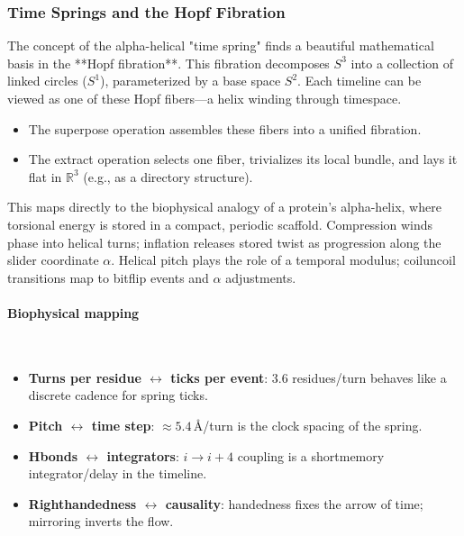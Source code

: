 \documentclass{article}
\begin{document}
\subsubsection{Time Springs and the Hopf Fibration}
The concept of the alpha-helical "time spring" finds a beautiful mathematical basis in the **Hopf fibration**. This fibration decomposes $S^3$ into a collection of linked circles ($S^1$), parameterized by a base space $S^2$. Each timeline can be viewed as one of these Hopf fibers---a helix winding through timespace.
\begin{itemize}
    \item The superpose operation assembles these fibers into a unified fibration.
    \item The extract operation selects one fiber, trivializes its local bundle, and lays it flat in $\mathbb{R}^3$ (e.g., as a directory structure).
\end{itemize}
This maps directly to the biophysical analogy of a protein's alpha-helix, where torsional energy is stored in a compact, periodic scaffold. Compression winds phase into helical turns; inflation releases stored twist as progression along the slider coordinate $\alpha$. Helical pitch plays the role of a temporal modulus; coil\textendash uncoil transitions map to bit\textendash flip events and $\alpha$ adjustments.

\paragraph{Biophysical mapping}\mbox{}\\
\begin{itemize}
  \item \textbf{Turns per residue $\leftrightarrow$ ticks per event}: 3.6 residues/turn behaves like a discrete cadence for spring ticks.
  \item \textbf{Pitch $\leftrightarrow$ time step}: $\approx 5.4\,\text{\AA}$/turn is the clock spacing of the spring.
  \item \textbf{H\textendash bonds $\leftrightarrow$ integrators}: $i\!\to\! i\!+\!4$ coupling is a short\textendash memory integrator/delay in the timeline.
  \item \textbf{Right\textendash handedness $\leftrightarrow$ causality}: handedness fixes the arrow of time; mirroring inverts the flow.
\end{itemize}
\end{document}

